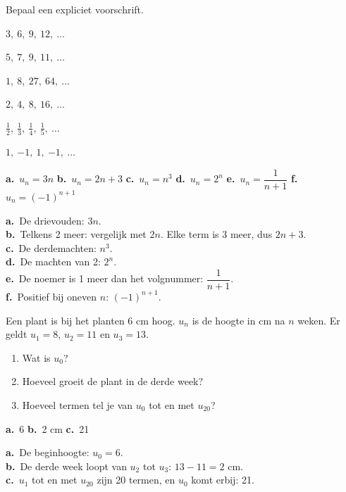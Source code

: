 \begin{oefeningen}
\begin{oefening}[1]\label{oef:h1-opstellen}
Bepaal een expliciet voorschrift.
\begin{reeks}
  \item $3,\ 6,\ 9,\ 12,\ \ldots$
  \item $5,\ 7,\ 9,\ 11,\ \ldots$
  \item $1,\ 8,\ 27,\ 64,\ \ldots$
  \item $2,\ 4,\ 8,\ 16,\ \ldots$
  \item $\tfrac12,\ \tfrac13,\ \tfrac14,\ \tfrac15,\ \ldots$
  \item $1,\ {-1},\ 1,\ {-1},\ \ldots$
\end{reeks}
\begin{solution}
\textbf{a.}~$u_n=3n$ \quad \textbf{b.}~$u_n=2n+3$ \quad \textbf{c.}~$u_n=n^3$ \quad \textbf{d.}~$u_n=2^n$ \quad \textbf{e.}~$u_n=\dfrac{1}{n+1}$ \quad \textbf{f.}~$u_n=(-1)^{n+1}$
\end{solution}
\begin{fullsolution}
\textbf{a.}~De drievouden: $3n$.\\
\textbf{b.}~Telkens 2 meer: vergelijk met $2n$. Elke term is 3 meer, dus $2n+3$.\\
\textbf{c.}~De derdemachten: $n^3$.\\
\textbf{d.}~De machten van 2: $2^n$.\\
\textbf{e.}~De noemer is 1 meer dan het volgnummer: $\dfrac{1}{n+1}$.\\
\textbf{f.}~Positief bij oneven $n$: $(-1)^{n+1}$.
\end{fullsolution}
\end{oefening}

\begin{oefening}[1]\label{oef:h1-plant}
Een plant is bij het planten 6 cm hoog. $u_n$ is de hoogte in cm na $n$ weken. Er geldt $u_1 = 8$, $u_2 = 11$ en $u_3 = 13$.
\begin{enumerate}
  \item Wat is $u_0$?
  \item Hoeveel groeit de plant in de derde week?
  \item Hoeveel termen tel je van $u_0$ tot en met $u_{20}$?
\end{enumerate}
\begin{solution}
\textbf{a.}~6 \quad \textbf{b.}~2 cm \quad \textbf{c.}~21
\end{solution}
\begin{fullsolution}
\textbf{a.}~De beginhoogte: $u_0=6$.\\
\textbf{b.}~De derde week loopt van $u_2$ tot $u_3$: $13-11=2$ cm.\\
\textbf{c.}~$u_1$ tot en met $u_{20}$ zijn 20 termen, en $u_0$ komt erbij: 21.
\end{fullsolution}
\end{oefening}


\end{oefeningen}
